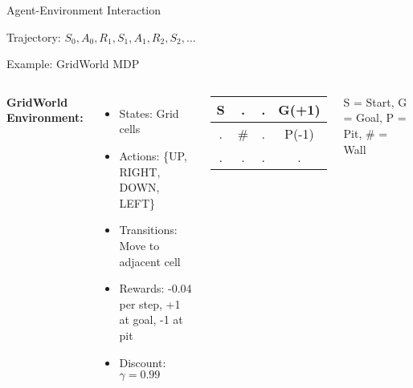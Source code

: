 \documentclass[aspectratio=169,10pt]{beamer}
\begin{document}
\begin{frame}{Agent-Environment Interaction}
\begin{center}
\end{center}

\vspace{0.5cm}
Trajectory: $S_0, A_0, R_1, S_1, A_1, R_2, S_2, \dots$
\end{frame}

\begin{frame}{Example: GridWorld MDP}
\begin{columns}
\textbf{GridWorld Environment:}
\begin{itemize}
    \item States: Grid cells
    \item Actions: \{UP, RIGHT, DOWN, LEFT\}
    \item Transitions: Move to adjacent cell
    \item Rewards: -0.04 per step, +1 at goal, -1 at pit
    \item Discount: $\gamma = 0.99$
\end{itemize}

\begin{center}
\begin{tabular}{|c|c|c|c|}
\hline
S & . & . & G(+1) \\
\hline
. & \# & . & P(-1) \\
\hline
. & . & . & . \\
\hline
\end{tabular}
\end{center}

\vspace{0.5cm}
S = Start, G = Goal, P = Pit, \# = Wall
\end{columns}
\end{frame}
\end{document}
